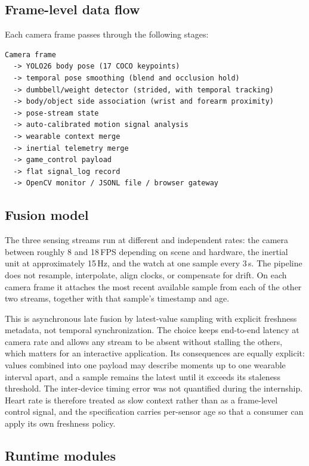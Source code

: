 \documentclass[11pt,a4paper]{article}
\begin{document}
\subsection{Frame-level data flow}

Each camera frame passes through the following stages:

\begin{lstlisting}
Camera frame
  -> YOLO26 body pose (17 COCO keypoints)
  -> temporal pose smoothing (blend and occlusion hold)
  -> dumbbell/weight detector (strided, with temporal tracking)
  -> body/object side association (wrist and forearm proximity)
  -> pose-stream state
  -> auto-calibrated motion signal analysis
  -> wearable context merge
  -> inertial telemetry merge
  -> game_control payload
  -> flat signal_log record
  -> OpenCV monitor / JSONL file / browser gateway
\end{lstlisting}

\subsection{Fusion model}
\label{sec:fusionmodel}

The three sensing streams run at different and independent rates: the camera
between roughly 8 and 18\,FPS depending on scene and hardware, the inertial unit
at approximately 15\,Hz, and the watch at one sample every 3\,s. The pipeline does
not resample, interpolate, align clocks, or compensate for drift. On each camera
frame it attaches the most recent available sample from each of the other two
streams, together with that sample's timestamp and age.

This is asynchronous late fusion by latest-value sampling with explicit freshness
metadata, not temporal synchronization. The choice keeps end-to-end latency at
camera rate and allows any stream to be absent without stalling the others, which
matters for an interactive application. Its consequences are equally explicit:
values combined into one payload may describe moments up to one wearable interval
apart, and a sample remains the latest until it exceeds its staleness threshold.
The inter-device timing error was not quantified during the internship. Heart
rate is therefore treated as slow context rather than as a frame-level control
signal, and the specification carries per-sensor age so that a consumer can apply
its own freshness policy.

\subsection{Runtime modules}
\end{document}
